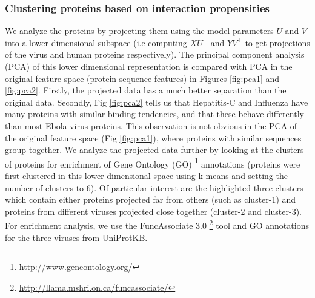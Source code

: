 \documentclass{bioinfo}
\begin{document}
\subsubsection{Clustering proteins based on interaction propensities}
We analyze the proteins by projecting them using the model parameters $U$ and $V$ into a lower dimensional subspace 
(i.e computing $X U^\intercal$ and $Y V^\intercal$ to get projections of the virus and human proteins respectively).  
The principal component analysis (PCA) of this lower dimensional representation is compared with PCA in the original feature space (protein sequence features) in Figures \ref{fig:pca1} and \ref{fig:pca2}. 
Firstly, the projected data has a much better separation than the original data.
Secondly, Fig \ref{fig:pca2} tells us that Hepatitis-C and Influenza have many proteins with similar binding tendencies, and that these behave differently than most Ebola virus proteins. This observation is not obvious in the PCA of the original feature space (Fig \ref{fig:pca1}), where proteins with similar sequences group together.
We analyze the projected data further by looking at the clusters of proteins for enrichment of Gene Ontology (GO) \footnote{\url{http://www.geneontology.org/}} \citep{GO} annotations (proteins were first clustered in this lower dimensional space using k-means and setting the number of clusters to 6). Of particular interest are the highlighted three clusters which contain either proteins projected far from others (such as cluster-1) and proteins from different viruses projected close together (cluster-2 and cluster-3).
For enrichment analysis, we use the FuncAssociate 3.0 \footnote{\url{http://llama.mshri.on.ca/funcassociate/}} \citep{funcAsso} tool and GO annotations for the three viruses from UniProtKB.
\end{document}
